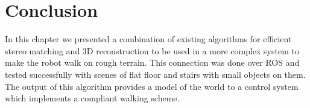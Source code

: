 
\section{Conclusion}

In this chapter we presented a combination of existing algorithms for efficient stereo matching and 3D reconstruction to be used in a more complex system to make the robot walk on rough terrain. This connection was done over ROS and tested successfully with scenes of flat floor and stairs with small objects on them. The output of this algorithm provides a model of the world to a control system which implements a compliant walking scheme.